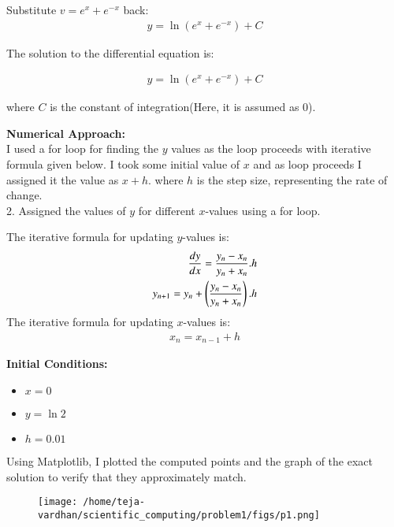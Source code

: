 \documentclass[article]{IEEEtran}
\numberwithin{figure}{enumi}
\begin{document}
\noindent Substitute $v = e^x + e^{-x}$ back:
\begin{align}
   y = \ln(e^x + e^{-x}) + C
\end{align}

\noindent The solution to the differential equation is:

\begin{align}
  \boxed{y = \ln(e^x + e^{-x}) + C}
\end{align}



where $C$ is the constant of integration(Here, it is assumed as 0).

\vspace{0.5em}

\noindent\textbf{Numerical Approach:}\\ I used a for loop for finding the $y$ values as the loop proceeds with iterative formula given below. I took some initial value of $x$ and as loop proceeds I assigned it the value as $x+h$. where $h$ is the step size, representing the rate of change. 
\\2. Assigned the values of $y$ for different $x$-values using a for loop.  

\noindent The iterative formula for updating $y$-values is:  
\begin{align}
    \frac{dy}{dx}=\frac{y_n-x_n}{y_n+x_n}.h\\
    y_{n+1}=y_n+\left(\frac{y_n-x_n}{y_n+x_n}\right).h
\end{align}
The iterative formula for updating $x$-values is: 
\begin{align}
    x_n=x_{n-1}+h
\end{align} 

\noindent\textbf{Initial Conditions:}  
\begin{itemize}
    \item $x = 0$  
    \item $y = \ln2$  
    \item $h = 0.01$  
\end{itemize}

Using Matplotlib, I plotted the computed points and the graph of the exact solution to verify that they approximately match.
\begin{figure}[h!]
	\centering
	\texttt{[image: /home/teja-vardhan/scientific\_computing/problem1/figs/p1.png]}
	\label{stemplot}
\end{figure}	
\end{document}
